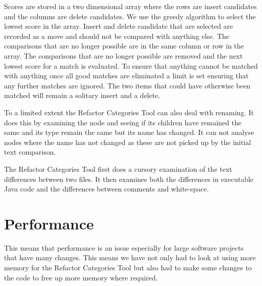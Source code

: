 Scores are stored in a two dimensional array where the rows are insert candidates and the columns are delete candidates.  We use the greedy algorithm to select the lowest score in the array.  Insert and delete candidate that are selected are recorded as a move and should not be compared with anything else. The comparisons that are no longer possible are in the same column or row in the array.  The comparisons that are no longer possible are removed and the next lowest score for a match is evaluated.  To ensure that anything cannot be matched with anything once all good matches are eliminated a limit is set ensuring that any further matches are ignored.  The two items that could have otherwise been matched will remain a solitary insert and a delete.

To a limited extent the Refactor Categories Tool can also deal with renaming. It does this by examining the node and seeing if its children have remained the same and its type remain the same but its name has changed. It can not analyse nodes where the name has not changed as these are not picked up by the initial text comparison.

The Refactor Categories Tool first does a cursory examination of the text differences between two files. It then examines both the differences in executable Java code and the differences between comments and white-space. 



\section{Performance}
 This means that performance is an issue especially for large software projects that have many changes. This means we have not only had to look at using more memory for the Refactor Categories Tool but also had to make some changes to the code to free up more memory where required.

